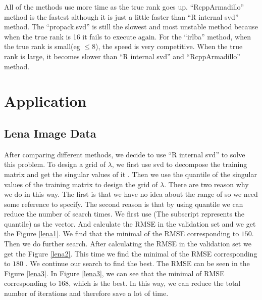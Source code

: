 \documentclass[12pt]{article}
\begin{document}
All of the methods use more time as the true rank goes up. “RcppArmadillo” method is the fastest although it is just a little faster than “R internal svd” method. The “propack.svd” is still the slowest and most unstable method because when the true rank is 16 it fails to execute again. For the “irlba” method, when the true rank is small(eg $\leq 8$), the speed is very competitive.  When the true rank is large, it becomes slower than “R internal svd” and “RcppArmadillo” method.

\section{Application}

\subsection{Lena Image Data}

After comparing different methods, we decide to use “R internal svd” to solve this problem.  To design a grid of $\lambda$, we first use svd to decompose the training matrix and get the singular values of it . Then we use the quantile of the singular values of the training matrix to design the grid of $\lambda$. There are two reason why we do in this way. The first is that we have no idea about the range of  so we need some reference to specify. The second reason is that by using quantile we can reduce the number of search times. We first use  (The subscript represents the quantile) as the  vector. And calculate the RMSE in the validation set and we get the Figure \ref{lena1}. We find that the minimal of the RMSE corresponding to $150$. Then we do further search. After calculating the RMSE in the validation set we get the Figure \ref{lena2}. This time we find the minimal of the RMSE corresponding to $180$ . We continue our search to find the best. The RMSE can be seen in the Figure \ref{lena3}. In Figure \ref{lena3}, we can see that the minimal of RMSE corresponding to  $168$,  which is the best. In this way, we can reduce the total number of iterations and therefore save a lot of time.
\end{document}
